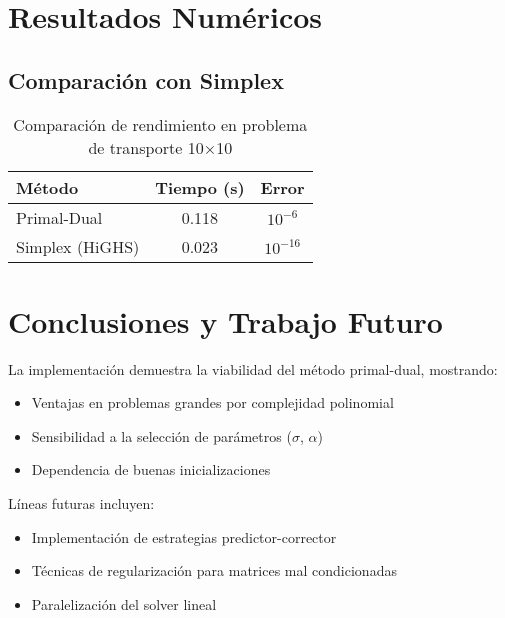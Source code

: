 \documentclass{article}
\begin{document}
\section{Resultados Numéricos}

\subsection{Comparación con Simplex}
\begin{table}[h]
\centering
\begin{tabular}{lcc}
\toprule
Método & Tiempo (s) & Error \\
\midrule
Primal-Dual & 0.118 & $10^{-6}$ \\
Simplex (HiGHS) & 0.023 & $10^{-16}$ \\
\bottomrule
\end{tabular}
\caption{Comparación de rendimiento en problema de transporte 10×10}
\end{table}

\section{Conclusiones y Trabajo Futuro}
La implementación demuestra la viabilidad del método primal-dual, mostrando:
\begin{itemize}
\item Ventajas en problemas grandes por complejidad polinomial
\item Sensibilidad a la selección de parámetros ($\sigma$, $\alpha$)
\item Dependencia de buenas inicializaciones
\end{itemize}

Líneas futuras incluyen:
\begin{itemize}
\item Implementación de estrategias predictor-corrector
\item Técnicas de regularización para matrices mal condicionadas
\item Paralelización del solver lineal
\end{itemize}
\end{document}
